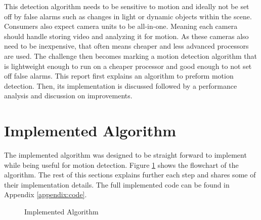 \documentclass[journal]{IEEEtran}
\begin{document}
This detection algorithm needs to be sensitive to motion and ideally not be set off by false alarms such as 
changes in light or dynamic objects within the scene. Consumers also expect camera units to be all-in-one. 
Meaning each camera should handle storing video and analyzing it for motion. As these cameras also need to be 
inexpensive, that often means cheaper  and less advanced processors are used. The challenge then becomes marking 
a motion detection algorithm that is lightweight enough to run on a cheaper processor and good enough to not set 
off false alarms. This report first explains an algorithm to preform motion detection.
Then, its implementation is discussed followed by a performance analysis and discussion on improvements. 

\section{Implemented Algorithm}
\label{section:algorithm}
The implemented algorithm was designed to be straight forward to implement while being useful for motion
detection. Figure \ref{fig:algorithm} shows the flowchart of the algorithm. The rest of this sections 
explains further each step and shares some of their implementation details. The full implemented code
can be found in Appendix \ref{appendix:code}.

\begin{figure}[!t]
    \centering
    \caption{Implemented Algorithm}
    \label{fig:algorithm}
\end{figure}
\end{document}
